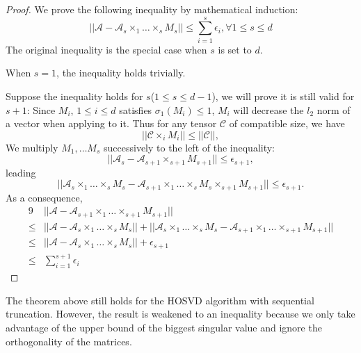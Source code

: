 \documentclass[12pt]{article}
\begin{document}
\begin{proof}
We prove the following inequality by mathematical induction:
$$ || \mathcal{A} - \mathcal{A}_s \times_1 \dots \times_s M_s || \leq \sum_{i = 1}^s \epsilon_i , \forall 1 \leq s \leq d $$
The original inequality is the special case when $s$ is set to $d$.

When $s = 1$, the inequality holds trivially.

Suppose the inequality holds for $s$($1 \leq s \leq d - 1$), we will prove it is still valid for $s + 1$:
Since $M_i$, $1 \leq i \leq d$ satisfies $\sigma_1(M_i) \leq 1$, $M_i$ will decrease the $l_2$ norm of a vector when applying to it. Thus for any tensor $\mathcal{C}$ of compatible size, we have
$$|| \mathcal{C} \times_i M_i || \leq || \mathcal{C} ||, $$
We multiply $M_1, \dots M_s$ successively to the left of the inequality:
$$ || \mathcal{A}_s - \mathcal{A}_{s+1} \times_{s+1} M_{s+1} || \leq \epsilon_{s+1}, $$
leading
$$ || \mathcal{A}_s \times_1 \dots \times_s M_s - \mathcal{A}_{s+1} \times_1 \dots \times_s M_s \times_{s+1} M_{s+1} || \leq \epsilon_{s+1}. $$
As a consequence,
\begin{alignat*}{9}
 &|| \mathcal{A} - \mathcal{A}_{s+1} \times_1 \dots \times_{s+1} M_{s+1} || \\
 \leq & || \mathcal{A} - \mathcal{A}_s \times_1 \dots \times_s M_s || + || \mathcal{A}_s \times_1 \dots \times_s M_s - \mathcal{A}_{s+1} \times_1 \dots \times_{s+1} M_{s+1} || \\
 \leq & || \mathcal{A} - \mathcal{A}_s \times_1 \dots \times_s M_s || + \epsilon_{s+1} \\
 \leq & \sum_{i = 1}^{s+1} \epsilon_i
\end{alignat*}
\end{proof}

\begin{myrmk}
The theorem above still holds for the HOSVD algorithm with sequential truncation. However, the result is weakened to an inequality because we only take advantage of the upper bound of the biggest singular value and ignore the orthogonality of the matrices.
\end{myrmk}

\end{document}
